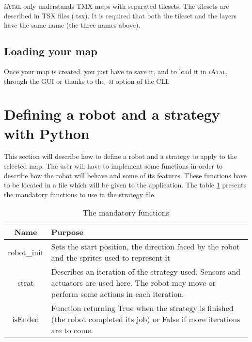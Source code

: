 \documentclass[a4paper,11pt]{article}
\newcommand\iAtal{$i$\textsc{Atal}}
\begin{document}
\iAtal{} only understands TMX maps with separated tilesets. The tilesets
are described in TSX files (.tsx). It is required that both the
tileset and the layers have the same name (the three names above).



\subsection{Loading your map}

Once your map is created, you just have to save it, and to load it in
\iAtal{}, through the GUI or thanks to the \textsc{-m} option of the
CLI.


\section{Defining a robot and a strategy with Python}

This section will describe how to define a robot and a strategy to
apply to the selected map. The user will have to implement some
functions in order to describe how the robot will behave and some of
its features. These functions have to be located in a file which will
be given to the application. The table \ref{tab:PyMandatoryFunc}
presents the mandatory functions to use in the strategy file.

\begin{table}[h]
  \begin{center}
    \begin{tabular}{|c|p{10cm}|}
      \hline
      Name        & Purpose                      \\
      \hline
      robot\_init & Sets the start position, the direction faced by the
      robot and the sprites used to represent it \\
      \hline
      strat       & Describes an iteration of the strategy used. Sensors and
      actuators are used here. The robot may move or perform some
      actions in each iteration.                 \\
      \hline
      isEnded     & Function returning True when the strategy is finished
      (the robot completed its job) or False if more iterations are to
      come.                                      \\ 
      \hline 
    \end{tabular}
    \caption{\label{tab:PyMandatoryFunc} The mandatory functions}
  \end{center}
\end{table}
\end{document}
